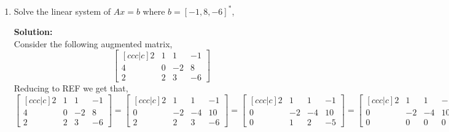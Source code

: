 \documentclass[12pt]{article}
\makeatletter
\theoremstyle{homework}
\newenvironment{exercise}[1]
{\def\@currentlabel{#1}\exercisecore}
{\endexercisecore}
\newcommand{\localhead}[1]{\par\smallskip\noindent\textbf{#1}\nobreak\\}%
\newcommand\solution{\localhead{Solution:}}
\makeatother
\begin{document}
\begin{exercise}{1}
\begin{enumerate}
\begin{equation*}
\begin{bmatrix}
            -2 & 4 
         \end{bmatrix}
          = 
          \begin{bmatrix}
            \frac{1}{4} & 0 \\
            -\frac{1}{4} & \frac{1}{2}
         \end{bmatrix}
     \end{equation*}
    \vspace{.25in}
    \item Solve the linear system of $Ax = b$ where $b = [-1, 8,-6]^*$,
    \solution  Consider the following augmented matrix, 
    \begin{equation*}
        \begin{bmatrix}[ccc|c]
            2& 1& 1 & -1\\
            4 & 0 & -2 & 8 \\
            2 & 2 & 3 & -6 
        \end{bmatrix}
    \end{equation*}
    Reducing to REF we get that, 
    \begin{equation*}
        \begin{bmatrix}[ccc|c]
            2& 1& 1 & -1\\
            4 & 0 & -2 & 8 \\
            2 & 2 & 3 & -6 
        \end{bmatrix}
        =
        \begin{bmatrix}[ccc|c]
            2& 1& 1 & -1\\
            0 & -2 & -4 & 10 \\
            2 & 2 & 3 & -6 
        \end{bmatrix}
        =
        \begin{bmatrix}[ccc|c]
            2& 1& 1 & -1\\
            0 & -2 & -4 & 10 \\
             0 & 1 & 2 & -5 
        \end{bmatrix}
        =
        \begin{bmatrix}[ccc|c]
            2& 1& 1 & -1\\
            0 & -2 & -4 & 10 \\
            0 & 0 & 0 & 0 
        \end{bmatrix}
        =
        \begin{bmatrix}[ccc|c]
            1& \frac{1}{2}& \frac{1}{2} & -\frac{1}{2}\\
            0 & 1 & 2 & -5 \\

\end{bmatrix}
\end{equation*}
\end{enumerate}
\end{exercise}
\end{document}

